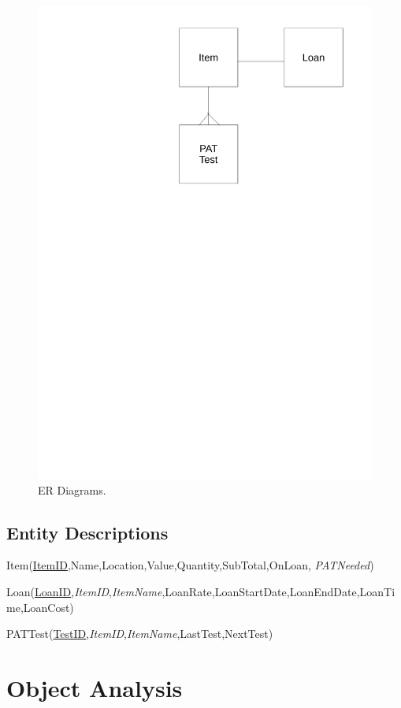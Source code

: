 \documentclass[a4paper,12pt]{report}
\begin{document}
\begin{figure}[H]
    \caption{ER Diagrams.} \label{fig:ER Diagrams}
    \includegraphics[width=\textwidth]{./ER_Diagrams/ER_Diagrams.pdf}
\end{figure}

\subsection{Entity Descriptions}

Item(\underline{ItemID},Name,Location,Value,Quantity,SubTotal,OnLoan, \emph{PATNeeded})

Loan(\underline{LoanID},\emph{ItemID},\emph{ItemName},LoanRate,LoanStartDate,LoanEndDate,LoanTime,LoanCost)

PATTest(\underline{TestID},\emph{ItemID},\emph{ItemName},LastTest,NextTest)

\section{Object Analysis}
\end{document}
